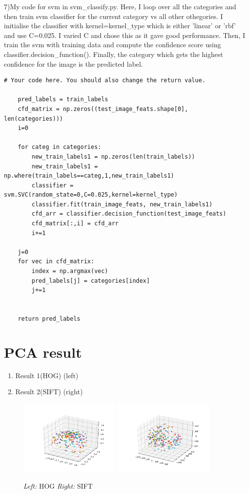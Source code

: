 7)My code for svm in svm\_classify.py. Here, I loop over all the categories and then train svm classifier for the current category vs all other othegories. I initialise the classifier with kernel=kernel\_type which is either 'linear' or 'rbf'  and use C=0.025. I varied C and chose this as it gave good performance. Then, I train the svm with training data and compute the confidence score using classifier.decision\_function(). Finally, the category which gets the highest confidence for the image is the predicted label.
\begin{lstlisting}[style=Matlab-editor]
    # Your code here. You should also change the return value.

    pred_labels = train_labels
    cfd_matrix = np.zeros((test_image_feats.shape[0], len(categories)))
    i=0

    for categ in categories:
        new_train_labels1 = np.zeros(len(train_labels))
        new_train_labels1 = np.where(train_labels==categ,1,new_train_labels1)
        classifier = svm.SVC(random_state=0,C=0.025,kernel=kernel_type)
        classifier.fit(train_image_feats, new_train_labels1)
        cfd_arr = classifier.decision_function(test_image_feats)
        cfd_matrix[:,i] = cfd_arr
        i+=1

    j=0
    for vec in cfd_matrix:
        index = np.argmax(vec)
        pred_labels[j] = categories[index]
        j+=1


    return pred_labels
\end{lstlisting}

\section*{PCA result}

\begin{enumerate}
    \item Result 1(HOG) (left)
    \item Result 2(SIFT) (right)
\end{enumerate}

\begin{figure}[h]
    \centering
    \includegraphics[width=5cm]{hog.png}
    \includegraphics[width=5cm]{sift.png}
    \caption{\emph{Left:} HOG \emph{Right:} SIFT}
    \label{fig:result1}
\end{figure}

